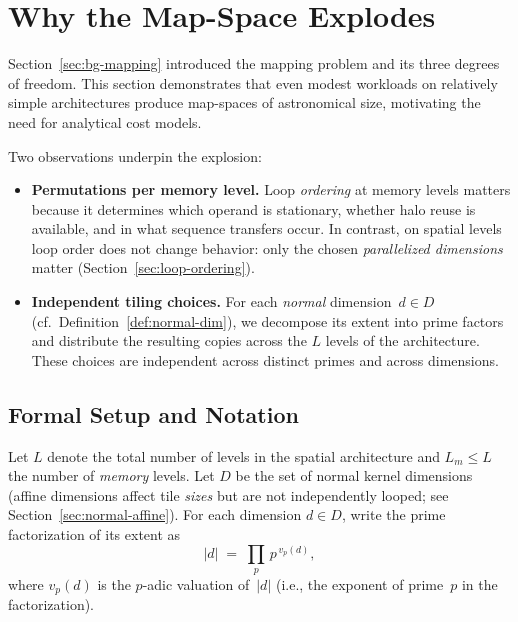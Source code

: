 \section{Why the Map-Space Explodes}
\label{sec:bg-mapspace}

Section~\ref{sec:bg-mapping} introduced the mapping problem and its
three degrees of freedom.
This section demonstrates that even modest workloads on relatively
simple architectures produce map-spaces of astronomical size, motivating
the need for analytical cost models.

Two observations underpin the explosion:

\begin{itemize}
  \item \textbf{Permutations per memory level.}
    Loop \emph{ordering} at memory levels matters because it determines
    which operand is stationary, whether halo reuse is available, and in
    what sequence transfers occur.
    In contrast, on spatial levels loop order does not change behavior:
    only the chosen \emph{parallelized dimensions} matter
    (Section~\ref{sec:loop-ordering}).

  \item \textbf{Independent tiling choices.}
    For each \emph{normal} dimension~$d \in D$
    (cf.\ Definition~\ref{def:normal-dim}), we decompose its extent
    into prime factors and distribute the resulting copies across the
    $L$ levels of the architecture.
    These choices are independent across distinct primes and across
    dimensions.
\end{itemize}

\subsection{Formal Setup and Notation}
\label{sec:mapspace-notation}

Let $L$ denote the total number of levels in the spatial architecture
and $L_m \le L$ the number of \emph{memory} levels.
Let $D$ be the set of normal kernel dimensions (affine dimensions
affect tile \emph{sizes} but are not independently looped; see
Section~\ref{sec:normal-affine}).
For each dimension $d \in D$, write the prime factorization of its
extent as
\[
  |d| \;=\; \prod_{p}\, p^{\,v_p(d)},
\]
where $v_p(d)$ is the $p$-adic valuation of~$|d|$ (i.e., the
exponent of prime~$p$ in the factorization).

